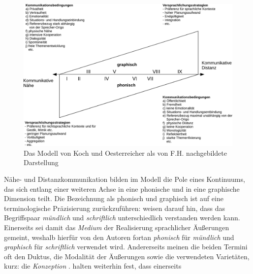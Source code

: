 
\begin{figure}
    \includegraphics[width=\textwidth]{Figures/K2/modell-koch-oesterreicher.pdf}
	\caption[Das Modell von Koch und Oesterreicher]{Das Modell von Koch und Oesterreicher als von F.H. nachgebildete Darstellung\label{K2:fig:modell-koch-oesterreicher}}
\end{figure}


Nähe- und Distanzkommunikation bilden im Modell die Pole eines Kontinuums, das sich entlang einer weiteren Achse in eine phonische und in eine graphische Dimension teilt. Die Bezeichnung als phonisch und graphisch ist auf eine terminologische Präzisierung zurückzuführen: \citeauthor{koch_schriftlichkeit_1994} weisen darauf hin, dass das Begriffspaar \emph{mündlich} und \emph{schriftlich} unterschiedlich verstanden werden kann. Einerseits sei damit das \glqq \emph{Medium} der Realisierung sprachlicher Äußerungen\grqq{} \citep[587, Kursivierung im Original]{koch_schriftlichkeit_1994} gemeint, weshalb hierfür von den Autoren fortan \emph{phonisch} für \emph{mündlich} und \emph{graphisch} für \emph{schriftlich} verwendet wird. Andererseits \glqq meinen die beiden Termini oft den Duktus, die Modalität der Äußerungen sowie die verwendeten Varietäten, kurz: die \emph{Konzeption}\grqq{} \citep[][587, Kursivierung im Original]{koch_schriftlichkeit_1994}. \citeauthor{koch_schriftlichkeit_1994} halten weiterhin fest, dass einerseits

